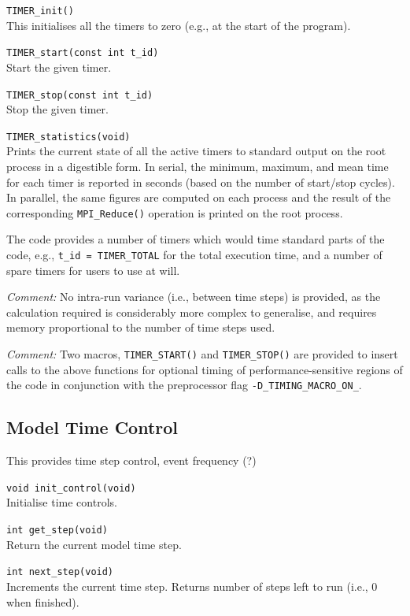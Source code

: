 \texttt{TIMER\_init()}\\
This initialises all the timers to zero (e.g., at the start of
the program).

\texttt{TIMER\_start(const int t\_id)}\\
Start the given timer.

\texttt{TIMER\_stop(const int t\_id)}\\
Stop the given timer.

\texttt{TIMER\_statistics(void)}\\
Prints the current state of all the active timers to standard
output on the root process in a digestible form. In serial,
the minimum, maximum, and mean time for each timer is reported
in seconds (based on the number of start/stop cycles). In
parallel, the same figures are computed on each process and the
result of the corresponding \texttt{MPI\_Reduce()} operation is
printed on the root process.

The code provides a number of timers which would time standard
parts of the code, e.g., \texttt{t\_id = TIMER\_TOTAL} for the
total execution time, and a number of spare timers for users to
use at will.


\textit{Comment:}
No intra-run variance (i.e., between time steps) is provided, as the
calculation required is considerably more complex to generalise, and
requires memory proportional to the number of time steps used.


\textit{Comment:}
Two macros, \texttt{TIMER\_START()} and \texttt{TIMER\_STOP()} are
provided to insert calls to the above functions for optional timing
of performance-sensitive regions
of the code in conjunction with the preprocessor flag
\texttt{-D\_TIMING\_MACRO\_ON\_}.


\subsection{Model Time Control}

This provides time step control, event frequency (?)

\texttt{void init\_control(void)}\\
Initialise time controls.

\texttt{int get\_step(void)}\\
Return the current model time step.

\texttt{int next\_step(void)}\\
Increments the current time step. Returns number of steps left
to run (i.e., 0 when finished).



